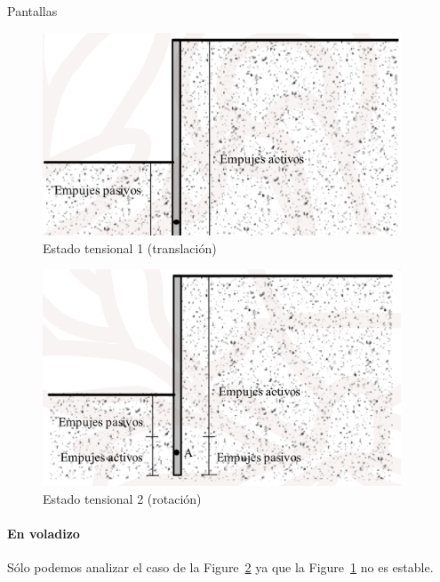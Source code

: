 \begin{mybox}{Pantallas}
	\begin{minipage}[t]{0.5\textwidth}
	\begin{figure}[H]
		\centering
		\includegraphics[width=0.95\textwidth]{img/confi1}
		\caption{Estado tensional 1 (translación)}
		\label{fig:confi1}
	\end{figure}
	\end{minipage}%
	\begin{minipage}[t]{0.5\textwidth}
	\begin{figure}[H]
		\centering
		\includegraphics[width=0.95\textwidth]{img/confi2}
		\caption{Estado tensional 2 (rotación)}
		\label{fig:confi2}
	\end{figure}
	\end{minipage}


	\paragraph{En voladizo} %
	\label{par:en_voladizo}

	Sólo podemos analizar el caso de la Figure~\ref{fig:confi2} ya que la Figure~\ref{fig:confi1} no es estable.
	

\end{mybox}
